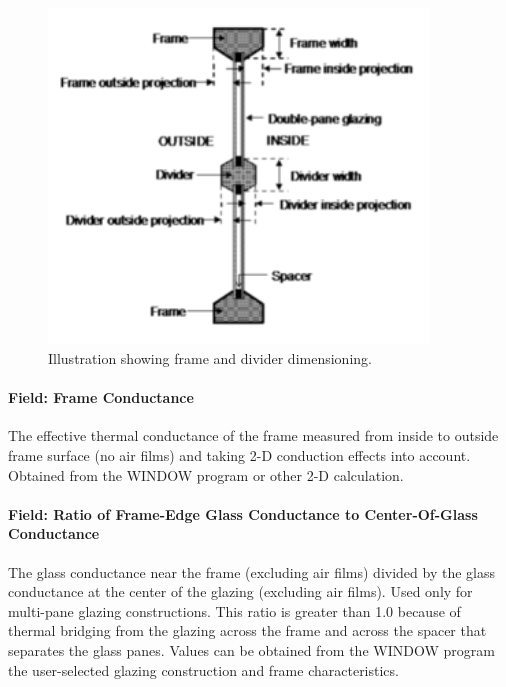 \begin{figure}[hbtp] %
\centering
\includegraphics[width=0.9\textwidth, height=0.9\textheight, keepaspectratio=true]{media/image062.png}
\caption{Illustration showing frame and divider dimensioning. \protect \label{fig:illustration-showing-frame-and-divider}}
\end{figure}

\paragraph{Field: Frame Conductance}\label{field-frame-conductance}

The effective thermal conductance of the frame measured from inside to outside frame surface (no air films) and taking 2-D conduction effects into account. Obtained from the WINDOW program or other 2-D calculation.

\paragraph{Field: Ratio of Frame-Edge Glass Conductance to Center-Of-Glass Conductance}\label{field-ratio-of-frame-edge-glass-conductance-to-center-of-glass-conductance}

The glass conductance near the frame (excluding air films) divided by the glass conductance at the center of the glazing (excluding air films). Used only for multi-pane glazing constructions. This ratio is greater than 1.0 because of thermal bridging from the glazing across the frame and across the spacer that separates the glass panes. Values can be obtained from the WINDOW program the user-selected glazing construction and frame characteristics.

